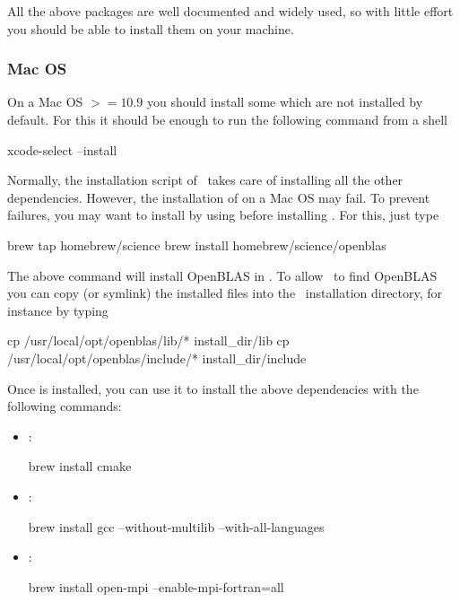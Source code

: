 \documentclass[a4paper,11pt,twoside]{article}
\begin{document}
All the above packages are well documented and widely used, so with little effort you should be able to install them on your machine.

\subsubsection{Mac OS}

On a Mac OS $>= 10.9$ you should install some  which are not installed by default. For this it should be enough to run the following command from a shell 
\begin{bashcode}
xcode-select --install
\end{bashcode}

Normally, the installation script of \beagle\ takes care of installing all the other dependencies. However, the installation of  on a Mac OS may fail. To prevent failures, you may want to install  by using  before installing \beagle. For this, just type
\begin{bashcode}
brew tap homebrew/science
brew install homebrew/science/openblas
\end{bashcode}
The above command will install OpenBLAS in . To allow \beagle\ to find OpenBLAS you can copy (or symlink) the installed files into the \beagle\ installation directory, for instance by typing
\begin{bashcode}
cp /usr/local/opt/openblas/lib/* install_dir/lib
cp /usr/local/opt/openblas/include/* install_dir/include
\end{bashcode}
	
Once  is installed, you can use it to install the above dependencies with the following commands:

\begin{itemize}
	
\item {}:
\begin{bashcode}
brew install cmake
\end{bashcode}
	
\item {}:
\begin{bashcode}
brew install gcc --without-multilib --with-all-languages
\end{bashcode}
	
\item {}:
\begin{bashcode}
brew install open-mpi --enable-mpi-fortran=all
 \end{bashcode}
	
\end{itemize}
\end{document}
